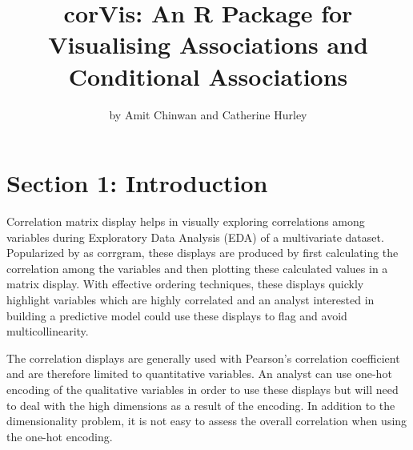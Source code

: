\title{corVis: An R Package for Visualising Associations and Conditional
Associations}
\author{by Amit Chinwan and Catherine Hurley}

\maketitle


\hypertarget{section-1-introduction}{%
\section{Section 1: Introduction}\label{section-1-introduction}}

Correlation matrix display helps in visually exploring correlations
among variables during Exploratory Data Analysis (EDA) of a multivariate
dataset. Popularized by \citet{friendly2002corrgrams} as corrgram, these
displays are produced by first calculating the correlation among the
variables and then plotting these calculated values in a matrix display.
With effective ordering techniques, these displays quickly highlight
variables which are highly correlated and an analyst interested in
building a predictive model could use these displays to flag and avoid
multicollinearity.

The correlation displays are generally used with Pearson's correlation
coefficient and are therefore limited to quantitative variables. An
analyst can use one-hot encoding of the qualitative variables in order
to use these displays but will need to deal with the high dimensions as
a result of the encoding. In addition to the dimensionality problem, it
is not easy to assess the overall correlation when using the one-hot
encoding.

